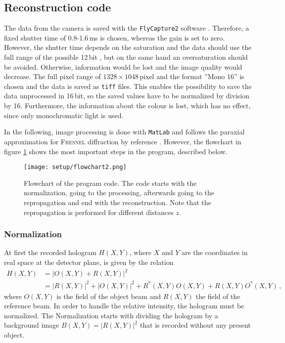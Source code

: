 \documentclass{article}
\begin{document}
\subsection{Reconstruction code} \label{sec:reconstructioncode}
The data from the camera is saved with the \texttt{FlyCapture2} software \cite{flycapture}. Therefore, a fixed shutter time of 0.8-1.6\,ms is chosen, whereas the gain is set to zero. However, the shutter time depends on the saturation and the data should use the full range of the possible 12\,bit \cite{pointGrey}, but on the same hand an oversaturation should be avoided. Otherwise, information would be lost and the image quality would decrease. The full pixel range of $1328\times1048$\,pixel and the format ''Mono 16'' is chosen and the data is saved as \texttt{tiff} \cite{tiff} files. This enables the possibility to save the data unprocessed in 16\,bit, so the saved values have to be normalized by division by 16. Furthermore, the information about the colour is lost, which has no effect, since only monochromatic light is used. 

In the following, image processing is done with \texttt{MatLab} \cite{matlab} and follows the paraxial approximation for \textsc{Fresnel} diffraction by reference \cite{Latychevskaia}. However, the flowchart in figure \ref{fig:flowchart1} shows the most important steps in the program, described below.
\begin{figure}
    \centering
    \texttt{[image: setup/flowchart2.png]}
    \caption{Flowchart of the program code. The code starts with the normalization, going to the processing, afterwards going to the repropagation and end with the reconstruction. Note that the repropagation is performed for different distances $z$.}
    \label{fig:flowchart1}
\end{figure}

\subsubsection{Normalization} 
At first the recorded hologram $H(X,Y)$, where $X$ and $Y$ are the coordinates in real space at the detector plane, is given by the relation \cite{Verrier:11}
\begin{align}
    H(X,Y)&= \left|O(X,Y)+R(X,Y)\right|^2\\
    &=\left|R(X,Y)\right|^2+\left|O(X,Y)\right|^2+R^*(X,Y)O(X,Y)+R(X,Y)O^*(X,Y)\,, \nonumber
\end{align}
where $O(X,Y)$ is the field of the object beam and $R(X,Y)$ the field of the reference beam. 
In order to handle the relative intensity, the hologram must be normalized.
The Normalization starts with dividing the hologram by a background image $B(X,Y)=|R(X,Y)|^2$ that is recorded without any present object.
\end{document}
